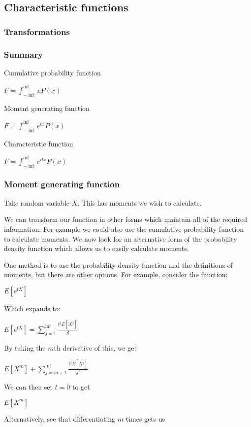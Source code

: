 
\subsection{Characteristic functions}

\subsubsection{Transformations}

\subsubsection{Summary}

Cumulative probability function

$F=\int_{-\inf }^\inf xP(x)$

Moment generating function

$F=\int_{-\inf }^\inf e^{tx}P(x)$

Characteristic function

$F=\int_{-\inf }^\inf e^{itx}P(x)$

\subsubsection{Moment generating function}

Take random variable \(X\). This has moments we wish to calculate.

We can transform our function in other forms which maintain all of the required information. For example we could also use the cumulative probability function to calculate moments. We now look for an alternative form of the probability density function which allows us to easily calculate moments.

One method is to use the probability density function and the definitions of moments, but there are other options. For example, consider the function:

$E[e^{tX}]$

Which expands to:

$E[e^{tX}]=\sum_{j=1}^\inf \frac{t^jE[X^j]}{j!}$

By taking the \(m\)th derivative of this, we get

$E[X^m]+\sum_{j=m+1}^\inf \frac{t^jE[X^j]}{j!}$

We can then set \(t=0\) to get

$E[X^m]$

Alternatively, see that differentiating \(m\) times gets us

